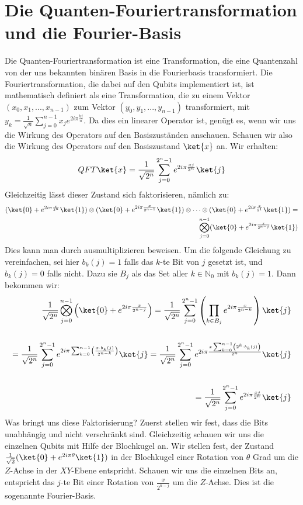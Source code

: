\section{Die Quanten-Fouriertransformation und die Fourier-Basis}
Die Quanten-Fouriertransformation ist eine Transformation, die eine Quantenzahl von der uns bekannten binären Basis in die Fourierbasis transformiert. Die Fouriertransformation, die dabei auf den Qubits implementiert ist, ist mathematisch definiert als eine Transformation, die zu einem Vektor $(x_0, x_1, ..., x_{n - 1})$ zum Vektor $(y_0, y_1, ..., y_{n - 1})$ transformiert, mit $y_k = \frac{1}{\sqrt{n}}\sum_{j = 0}^{n - 1}x_je^{2i\pi\frac{kj}{n}}$. Da dies ein linearer Operator ist, genügt es, wenn wir uns die Wirkung des Operators auf den Basiszuständen anschauen. Schauen wir also die Wirkung des Operators auf den Basiszustand $\ket{x}$ an. Wir erhalten:
$$QFT\ket{x} = \frac{1}{\sqrt{2^n}}\sum^{2^n - 1}_{j = 0}e^{2i\pi\frac{xj}{2^n}}\ket{j}$$
Gleichzeitig lässt dieser Zustand sich faktorisieren, nämlich zu:
\begin{align*}
(\ket{0} + e^{2i\pi\frac{x}{2^{n}}}\ket{1})\otimes(\ket{0} + e^{2i\pi\frac{x}{2^{n - 1}}}\ket{1})\otimes\cdots\otimes(\ket{0} + e^{2i\pi\frac{x}{2^{1}}}\ket{1}) = \\ \bigotimes_{j = 0}^{n - 1}(\ket{0} + e^{2i\pi\frac{x}{2^{n - j}}}\ket{1})
\end{align*}
Dies kann man durch ausmultiplizieren beweisen. Um die folgende Gleichung zu vereinfachen, sei hier $b_k(j) = 1$ falls das $k$-te Bit von $j$ gesetzt ist, und $b_k(j) = 0$ falls nicht. Dazu sie $B_j$ als das Set aller $k \in \mathbb{N}_0$ mit $b_k(j) = 1$. Dann bekommen wir:
\begin{align*}
\frac{1}{\sqrt{2^n}}\bigotimes_{j = 0}^{n - 1}\left(\ket{0} + e^{2i\pi\frac{x}{2^{n - j}}}\right) = \frac{1}{\sqrt{2^n}}\sum_{j = 0}^{2^n - 1}\left(\prod_{k \in B_j}e^{2i\pi\frac{x}{2^{n - k}}}\right)\ket{j} \\ \\
= \frac{1}{\sqrt{2^n}}\sum_{j = 0}^{2^n - 1}e^{2i\pi\sum_{k = 0}^{n - 1}\left(\frac{x \cdot b_k(j)}{2^{n - k}}\right)}\ket{j} = \frac{1}{\sqrt{2^n}}\sum_{j = 0}^{2^n - 1}e^{2i\pi\frac{x\sum_{k = 0}^{n - 1}\left(2^k\cdot b_k(j)\right)}{2^n}}\ket{j} \\ \\
= \frac{1}{\sqrt{2^n}}\sum_{j = 0}^{2^n - 1}e^{2i\pi\frac{xj}{2^n}}\ket{j}
\end{align*}
Was bringt uns diese Faktorisierung? Zuerst stellen wir fest, dass die Bits unabhängig und nicht verschränkt sind. Gleichzeitig schauen wir uns die einzelnen Qubits mit Hilfe der Blochkugel an. Wir stellen fest, der Zustand $\frac{1}{\sqrt{2}}(\ket{0} + e^{2i\pi\theta}\ket{1})$ in der Blochkugel einer Rotation von $\theta$ Grad um die $Z$-Achse in der $XY$-Ebene entspricht. Schauen wir uns die einzelnen Bits an, entspricht das $j$-te Bit einer Rotation von $\frac{x}{2^{n - j}}$ um die $Z$-Achse. Dies ist die sogenannte Fourier-Basis.

